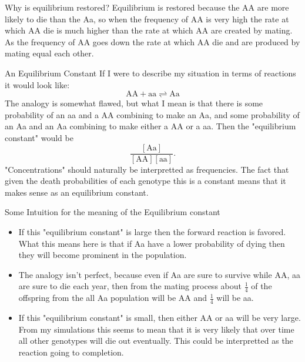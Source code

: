 \documentclass[xcolor=x11names, svgnames, rgb]{beamer}
\newcommand{\dom}{\text{AA}}
\newcommand{\het}{\text{Aa}}
\newcommand{\rec}{\text{aa}}
\begin{document}
\begin{frame}[t]{Why is equilibrium restored?}
	Equilibrium is restored because the AA are more likely to die than the Aa, so
	when the frequency of AA is very high the rate at which AA die is much higher
	than the rate at which AA are created by mating. As the frequency of AA goes
	down the rate at which AA die and are produced by mating equal each other.
	
\end{frame}

\begin{frame}[t]{An Equilibrium Constant}
	If I were to describe my situation in terms of reactions it would look like:
	$$\dom + \rec \rightleftharpoons \het$$
	The analogy is somewhat flawed, but what I mean is that there is some probability of an aa and a AA combining to make an Aa, and some probability of an Aa and an Aa combining to make either a AA or a aa.
	Then the "equilibrium constant" would be 
	$$\frac{[\het]}{[\dom][\rec]}.$$
	"Concentrations" should naturally be interpretted as frequencies.
	The fact that given the death probabilities of each genotype this is a constant means that it makes sense as an equilibrium constant. 

\end{frame}

\begin{frame}[t]{Some Intuition for the meaning of the Equilibrium constant}
	\begin{itemize}
		\item If this "equilibrium constant" is large then the forward reaction is favored. What this means here is that if Aa have a lower probability of dying then they will become prominent in the population.
		\item The analogy isn't perfect, because even if Aa are sure to survive while AA, aa are sure to die each year, then from the mating process about $\frac{1}{4}$ of the offspring from the all Aa population will be AA and $\frac{1}{4}$ will be aa.
		\item If this "equilibrium constant" is small, then either AA or aa will be very large. From my simulations this seems to mean that it is very likely that over time all other genotypes will die out eventually. This could be interpretted as the reaction going to completion.
	\end{itemize}
\end{frame}
\end{document}
